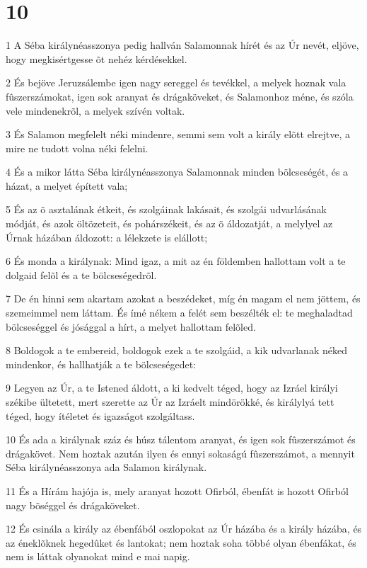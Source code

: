\chapter{10}

\par 1 A Séba királynéasszonya pedig hallván Salamonnak hírét és  az Úr nevét, eljöve, hogy megkisértgesse õt nehéz kérdésekkel.
\par 2 És bejöve Jeruzsálembe igen nagy sereggel és tevékkel, a melyek hoznak vala fûszerszámokat, igen sok aranyat és drágaköveket, és Salamonhoz méne, és szóla vele mindenekrõl, a melyek szívén voltak.
\par 3 És Salamon megfelelt néki mindenre, semmi sem volt a király elõtt elrejtve, a mire ne tudott volna néki felelni.
\par 4 És a mikor látta Séba királynéasszonya Salamonnak minden bölcseségét, és a házat, a melyet épített vala;
\par 5 És az õ asztalának étkeit, és szolgáinak lakásait, és szolgái udvarlásának módját, és azok öltözeteit, és pohárszékeit, és az õ áldozatját, a melylyel az Úrnak házában áldozott: a lélekzete is elállott;
\par 6 És monda a királynak: Mind igaz, a mit az én földemben hallottam volt a te dolgaid felõl és a te bölcseségedrõl.
\par 7 De én hinni sem akartam azokat a beszédeket, míg én magam el nem jöttem, és szemeimmel nem láttam. És ímé nékem a felét sem beszélték el: te meghaladtad bölcseséggel és jósággal a hírt, a melyet hallottam felõled.
\par 8 Boldogok a te embereid, boldogok ezek a te szolgáid, a kik udvarlanak néked mindenkor, és hallhatják a te bölcseségedet:
\par 9 Legyen az Úr, a te Istened áldott, a ki kedvelt téged, hogy az Izráel királyi székibe ültetett, mert szerette az Úr az Izráelt mindörökké, és királylyá tett téged, hogy ítéletet és igazságot szolgáltass.
\par 10 És ada a királynak száz és húsz tálentom aranyat, és igen sok fûszerszámot és drágakövet. Nem hoztak azután ilyen és ennyi sokaságú fûszerszámot, a mennyit Séba királynéasszonya ada Salamon királynak.
\par 11 És a Hírám hajója is, mely aranyat hozott Ofirból, ébenfát is hozott Ofirból nagy bõséggel és drágaköveket.
\par 12 És csinála a király az ébenfából oszlopokat az Úr házába és a király házába, és az éneklõknek hegedûket és lantokat; nem hoztak soha többé olyan ébenfákat, és nem is láttak olyanokat mind e mai napig.
